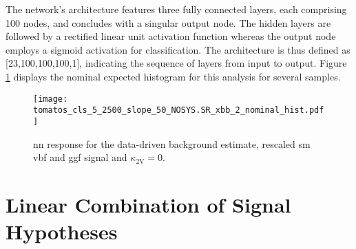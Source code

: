 The network's architecture features three fully connected layers, each comprising 100 nodes, and concludes with a singular output node. The hidden layers are followed by a rectified linear unit activation function whereas the output node employs a sigmoid activation for classification. The architecture is thus defined as [23,100,100,100,1], indicating the sequence of layers from input to output. Figure \ref{fig:nominal-hist} displays the nominal expected histogram for this analysis for several samples.

\begin{figure}
    \centering
    \texttt{[image: tomatos\_cls\_5\_2500\_slope\_50\_NOSYS.SR\_xbb\_2\_nominal\_hist.pdf]}
    \caption[]{\ac{nn} response for the data-driven background estimate, rescaled \ac{sm}  \ac{vbf} and \ac{ggf} signal and $\kappa_\text{2V}=0$.}
    \label{fig:nominal-hist}
\end{figure}


\section{Linear Combination of Signal Hypotheses}\label{sec:linear_combination}


